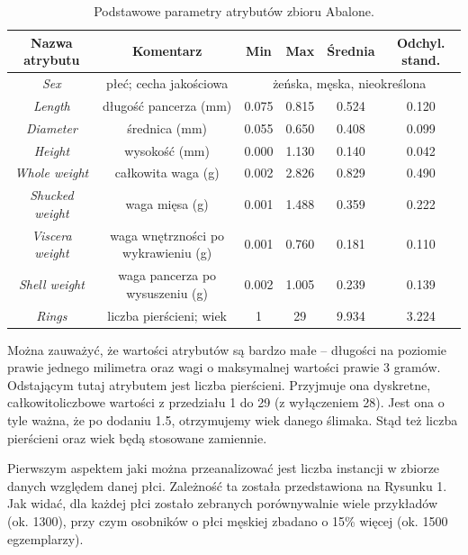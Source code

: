 \documentclass{scrartcl}
\begin{document}
  \begin{table}[H]
    \center
    \begin{tabular}{|c|c|c|c|c|c|}
      \hline
      \textbf{Nazwa atrybutu} & \textbf{Komentarz}      & \textbf{Min} & \textbf{Max} & \textbf{Średnia} & \textbf{Odchyl. stand.} \\ \hline
      \textit{Sex}            & płeć; cecha jakościowa  & \multicolumn{4}{|c|}{żeńska, męska, nieokreślona} \\ \hline \hline
      \textit{Length}         & długość pancerza (mm)   & 0.075        & 0.815        & 0.524            & 0.120 \\ \hline
      \textit{Diameter}       & średnica (mm)           & 0.055        & 0.650        & 0.408            & 0.099 \\ \hline
      \textit{Height}         & wysokość (mm)           & 0.000        & 1.130        & 0.140            & 0.042 \\ \hline
      \textit{Whole weight}   & całkowita waga (g)      & 0.002        & 2.826        & 0.829            & 0.490 \\ \hline
      \textit{Shucked weight} & waga mięsa (g)          & 0.001        & 1.488        & 0.359            & 0.222 \\ \hline
      \textit{Viscera weight} & waga wnętrzności po wykrawieniu (g) & 0.001  & 0.760  & 0.181            & 0.110 \\ \hline
      \textit{Shell weight}   & waga pancerza po wysuszeniu (g)     & 0.002  & 1.005  & 0.239            & 0.139 \\ \hline \hline
      \textit{Rings}          & liczba pierścieni; wiek & 1            & 29           & 9.934            & 3.224 \\ \hline
    \end{tabular}
    \caption{Podstawowe parametry atrybutów zbioru Abalone.}
  \end{table}

  Można zauważyć, że wartości atrybutów są bardzo małe -- długości na poziomie 
  prawie jednego milimetra oraz wagi o maksymalnej wartości prawie 3 gramów.
  Odstającym tutaj atrybutem jest liczba pierścieni. Przyjmuje ona dyskretne,
  całkowitoliczbowe wartości z przedziału 1 do 29 (z wyłączeniem 28). Jest ona
  o tyle ważna, że po dodaniu 1.5, otrzymujemy wiek danego ślimaka. Stąd też
  liczba pierścieni oraz wiek będą stosowane zamiennie.

  \pagebreak

  Pierwszym aspektem jaki można przeanalizować jest liczba instancji w zbiorze
  danych względem danej płci. Zależność ta została przedstawiona na Rysunku 1.
  Jak widać, dla każdej płci zostało zebranych porównywalnie wiele przykładów (ok. 1300),
  przy czym osobników o płci męskiej zbadano o 15\% więcej (ok. 1500 egzemplarzy).
\end{document}

